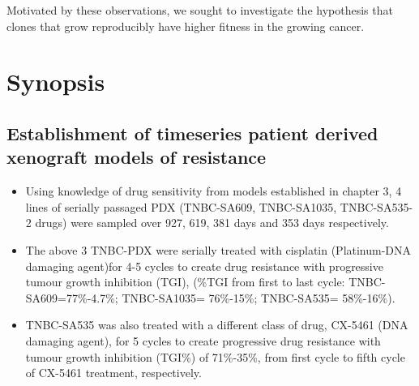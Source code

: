 Motivated by these observations, we sought to investigate the hypothesis that clones that grow reproducibly have higher fitness in the growing cancer.


\section{Synopsis}

\subsection {Establishment of timeseries patient derived xenograft models of resistance}
\begin{itemize}
\item	Using knowledge of drug sensitivity from models established in chapter 3, 4 lines of serially passaged PDX (TNBC-SA609, TNBC-SA1035, TNBC-SA535-2 drugs) were sampled over 927, 619, 381 days and 353 days respectively.

\item	The above 3 TNBC-PDX were serially treated with cisplatin (Platinum-DNA damaging agent)for 4-5 cycles to create drug resistance with progressive tumour growth inhibition (TGI), (\%TGI from first to last cycle: TNBC-SA609=77\%-4.7\%; TNBC-SA1035= 76\%-15\%; TNBC-SA535= 58\%-16\%).

\item  TNBC-SA535 was also treated with a different class of drug, CX-5461 (DNA damaging agent), for 5 cycles to create progressive drug resistance with tumour growth inhibition (TGI\%) of 71\%-35\%, from first cycle to fifth cycle of CX-5461 treatment, respectively.


\end{itemize}



